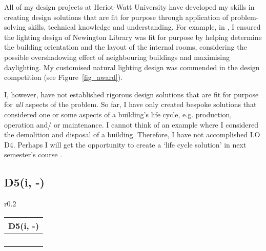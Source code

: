 All of my design projects at Heriot-Watt University have developed my skills in creating design solutions that are fit for purpose through application of problem-solving skills, technical knowledge and understanding.
For example, in \CASTitle, I ensured the lighting design of Newington Library was fit for purpose by helping determine the building orientation and the layout of the internal rooms, considering the possible overshadowing effect of neighbouring buildings and maximising daylighting.
My customised natural lighting design was commended in the design competition (see Figure~\ref{fig_award}).

I, however, have not established rigorous design solutions that are fit for purpose for \emph{all} aspects of the problem.
So far, I have only created bespoke solutions that considered one or some aspects of a building's life cycle, e.g. production, operation and/ or maintenance.
I cannot think of an example where I considered the demolition and disposal of a building.
Therefore, I have not accomplished LO D4.
Perhaps I will get the opportunity to create a `life cycle solution' in next semester's course \LCBTitle.









\subsection*{D5(i, -)}

\begin{wraptable}{r}{0.2\textwidth}
	\begin{tabular}{|ll|}
		\hline
		\multicolumn{2}{|c|}{\cellcolor[HTML]{F8A102}\textbf{D5(i, -)} \nomaster} \\ \hline
		\IE & \DPA \\
		\DPB & \CAS \\
		\PRJ & \DST \\
		\LAB & \CCSA \\ \hline
	\end{tabular}
\end{wraptable}

